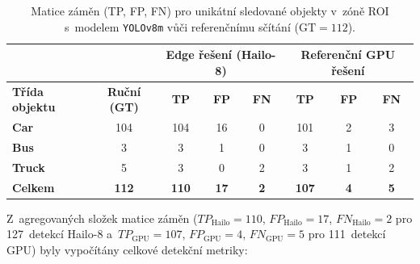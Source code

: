 \begin{table}[H]
    \centering
    \small\renewcommand{\arraystretch}{1.2}
    \setlength{\tabcolsep}{6pt}
    \begin{tabular}{|l|c|c|c|c|c|c|c|}
        \hline
        & & \multicolumn{3}{c|}{\textbf{Edge řešení (Hailo-8)}} & \multicolumn{3}{c|}{\textbf{Referenční GPU řešení}} \\ \hline
        \textbf{Třída objektu} & \textbf{Ruční (GT)} & \textbf{TP} & \textbf{FP} & \textbf{FN} & \textbf{TP} & \textbf{FP} & \textbf{FN} \\ \hline
        \textbf{Car} & 104 & 104 & 16 & 0 & 101 & 2 & 3 \\ \hline
        \textbf{Bus} & 3 & 3 & 1 & 0 & 3 & 1 & 0 \\ \hline
        \textbf{Truck} & 5 & 3 & 0 & 2 & 3 & 1 & 2 \\ \hline \hline
        \textbf{Celkem} & \textbf{112} & \textbf{110} & \textbf{17} & \textbf{2} & \textbf{107} & \textbf{4} & \textbf{5} \\ \hline
    \end{tabular}
    \caption{Matice záměn (\acs{TP}, \acs{FP}, \acs{FN}) pro unikátní sledované objekty v~zóně ROI s~modelem \texttt{YOLOv8m} vůči referenčnímu sčítání ($\text{GT} = 112$).}
    \label{tab:confusion_matrix}
\end{table}

Z~agregovaných složek matice záměn ($TP_{\text{Hailo}} = 110$, $FP_{\text{Hailo}} = 17$, $FN_{\text{Hailo}} = 2$ pro 127~detekcí Hailo-8 a~$TP_{\text{GPU}} = 107$, $FP_{\text{GPU}} = 4$, $FN_{\text{GPU}} = 5$ pro 111~detekcí GPU) byly vypočítány celkové detekční metriky:


